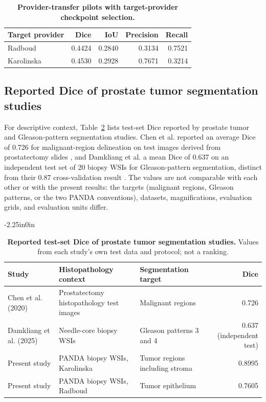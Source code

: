 \documentclass[10pt,letterpaper]{article}
\begin{document}
\begin{table}[H]\centering
\caption{\textbf{Provider-transfer pilots with target-provider checkpoint selection.}}
\begin{tabular}{lrrrr}\toprule Target provider & Dice & IoU & Precision & Recall\\\midrule
Radboud & 0.4424 & 0.2840 & 0.3134 & 0.7521\\
Karolinska & 0.4530 & 0.2928 & 0.7671 & 0.3214\\\bottomrule
\end{tabular}\label{tab:holdout}\end{table}

\subsection*{Reported Dice of prostate tumor segmentation studies}
For descriptive context, Table~\ref{tab:literature} lists test-set Dice reported by prostate tumor and Gleason-pattern segmentation studies. Chen et al. reported an average Dice of 0.726 for malignant-region delineation on test images derived from prostatectomy slides \cite{bib59}, and Damkliang et al. a mean Dice of 0.637 on an independent test set of 20 biopsy WSIs for Gleason-pattern segmentation, distinct from their 0.87 cross-validation result \cite{bib62}. The values are not comparable with each other or with the present results: the targets (malignant regions, Gleason patterns, or the two PANDA conventions), datasets, magnifications, evaluation grids, and evaluation units differ.

\begin{table}[H]\begin{adjustwidth}{-2.25in}{0in}\centering
\caption{\textbf{Reported test-set Dice of prostate tumor segmentation studies.} Values from each study's own test data and protocol; not a ranking.}
\begin{tabular}{p{3.0cm}p{4.5cm}p{4.6cm}r}\toprule
Study & Histopathology context & Segmentation target & Dice\\\midrule
Chen et al. (2020) \cite{bib59} & Prostatectomy histopathology test images & Malignant regions & 0.726\\
Damkliang et al. (2025) \cite{bib62} & Needle-core biopsy WSIs & Gleason patterns 3 and 4 & 0.637 (independent test)\\
Present study & PANDA biopsy WSIs, Karolinska & Tumor regions including stroma & 0.8995\\
Present study & PANDA biopsy WSIs, Radboud & Tumor epithelium & 0.7605\\\bottomrule
\end{tabular}\label{tab:literature}\end{adjustwidth}\end{table}
\end{document}
